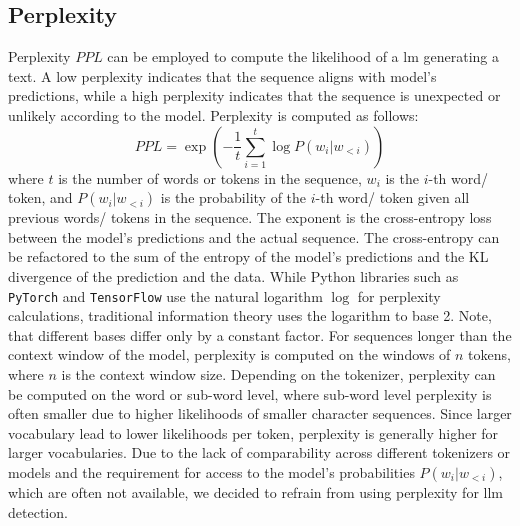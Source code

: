 \subsection{Perplexity}
\label{subsec:perplexity}

Perplexity $PPL$ can be employed to compute the likelihood of a \ac{lm} generating a text.
A low perplexity indicates that the sequence aligns with model's predictions, 
while a high perplexity indicates that the sequence is unexpected or unlikely according to the model.
Perplexity is computed as follows:
\begin{equation}
    PPL = \exp\left(-\frac{1}{t}\sum_{i=1}^{t}\log P(w_i|w_{<i})\right)
\end{equation}
where $t$ is the number of words or tokens in the sequence, 
$w_i$ is the $i$-th word/ token, and $P(w_i|w_{<i})$ is the probability of the $i$-th word/ token given all previous words/ tokens in the sequence.
The exponent is the cross-entropy loss between the model's predictions and the actual sequence.
The cross-entropy can be refactored to the sum of the entropy of the model's predictions and the KL divergence of the prediction and the data.
While Python libraries such as \texttt{PyTorch} and \texttt{TensorFlow} use the natural logarithm $\log$ for perplexity calculations,
traditional information theory uses the logarithm to base 2. 
Note, that different bases differ only by a constant factor.
For sequences longer than the context window of the model, 
perplexity is computed on the windows of $n$ tokens, where $n$ is the context window size.
Depending on the tokenizer, perplexity can be computed on the word or sub-word level, 
where sub-word level perplexity is often smaller due to higher likelihoods of smaller character sequences.
Since larger vocabulary lead to lower likelihoods per token, perplexity is generally higher for larger vocabularies.
Due to the lack of comparability across different tokenizers or models and 
the requirement for access to the model's probabilities $P(w_i|w_{<i})$, which are often not available, 
we decided to refrain from using perplexity for \ac{llm} detection.
